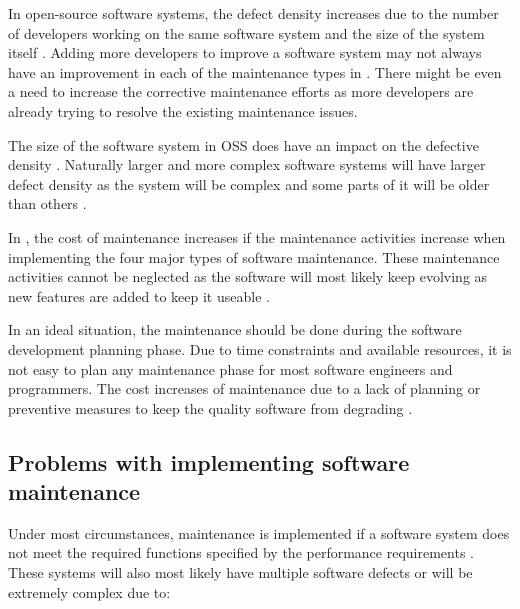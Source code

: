 In open-source software systems, the defect density increases due to the number of developers working on the same software system and the size of the system itself \cite{Rahmani2010}. Adding more developers to improve a software system may not always have an improvement in each of the maintenance types in . There might be even a need to increase the corrective maintenance efforts as more developers are already trying to resolve the existing maintenance issues.\par The size of the software system in OSS does have an impact on the defective density \cite{Rahmani2010}. Naturally larger and more complex software systems will have larger defect density as the system will be complex and some parts of it will be older than others \cite{SourceForged2009}. 

In , the cost of maintenance increases if the maintenance activities increase when implementing the four major types of software maintenance. These maintenance activities cannot be neglected as the software will most likely keep evolving as new features are added to keep it useable \cite{Alenezi2016}. \par In an ideal situation, the maintenance should be done during the software development planning phase. Due to time constraints and available resources, it is not easy to plan any maintenance phase for most software engineers and programmers. The cost increases of maintenance due to a lack of planning or preventive measures to keep the quality software from degrading \cite{Alenezi2016}.

\subsection{Problems with implementing software maintenance}\label{sec:ch1_maintenanceProblems}

Under most circumstances, maintenance is implemented if a software system does not meet the required functions specified by the performance requirements \cite{Ogheneovo2014, Sneed2004}. These systems will also most likely have multiple software defects or will be extremely complex due to:

